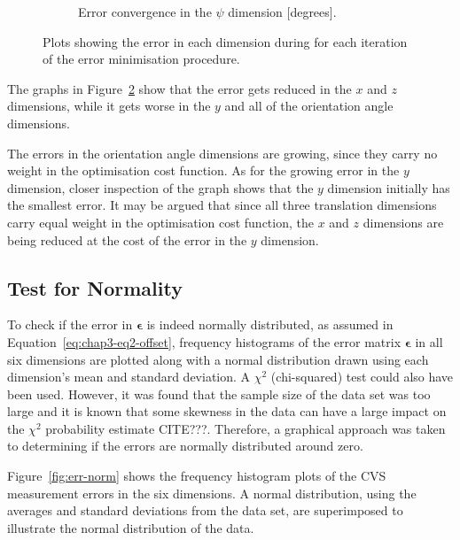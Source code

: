 \begin{figure}
\begin{subfigure}{0.45\textwidth}
    \caption{Error convergence in the $\psi$ dimension [degrees].}
\label{fig:err-convergence-psi}
  \end{subfigure}
  \caption[Plots showing error convergence for the optimsation procedure.]{Plots showing the error in each dimension during for each iteration of the error minimisation procedure.}
  \label{fig:err-convergence}
\end{figure}

The graphs in Figure~\ref{fig:err-convergence} show that the error gets reduced in the $x$ and $z$ dimensions, while it gets worse in the $y$ and all of the orientation angle dimensions. 

The errors in the orientation angle dimensions are growing, since they carry no weight in the optimisation cost function. As for the growing error in the $y$ dimension, closer inspection of the graph shows that the $y$ dimension initially has the smallest error. It may be argued that since all three translation dimensions carry equal weight in the optimisation cost function, the $x$ and $z$ dimensions are being reduced at the cost of the error in the $y$ dimension. 

\subsection{Test for Normality}
\label{sec:err-norm-test}

To check if the error in $\bm{\epsilon}$ is indeed normally distributed, as assumed in Equation~\ref{eq:chap3-eq2-offset}, frequency histograms of the error matrix $\bm{\epsilon}$ in all six dimensions are plotted along with a normal distribution drawn using each dimension's mean and standard deviation. A $\chi^2$ (chi-squared) test could also have been used. However, it was found that the sample size of the data set was too large and it is known that some skewness in the data can have a large impact on the $\chi^2$ probability estimate CITE???. Therefore, a graphical approach was taken to determining if the errors are normally distributed around zero. 

Figure~\ref{fig:err-norm} shows the frequency histogram plots of the CVS measurement errors in the six dimensions. A normal distribution, using the averages and standard deviations from the data set, are superimposed to illustrate the normal distribution of the data.

